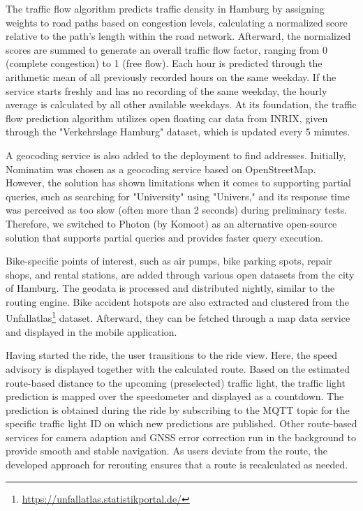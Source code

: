 The traffic flow algorithm predicts traffic density in Hamburg by assigning weights to road paths based on congestion levels, calculating a normalized score relative to the path's length within the road network. Afterward, the normalized scores are summed to generate an overall traffic flow factor, ranging from 0 (complete congestion) to 1 (free flow). Each hour is predicted through the arithmetic mean of all previously recorded hours on the same weekday. If the service starts freshly and has no recording of the same weekday, the hourly average is calculated by all other available weekdays. At its foundation, the traffic flow prediction algorithm utilizes open floating car data from INRIX, given through the "Verkehrslage Hamburg" dataset, which is updated every 5 minutes.

A geocoding service is also added to the deployment to find addresses. Initially, Nominatim was chosen as a geocoding service based on OpenStreetMap. However, the solution has shown limitations when it comes to supporting partial queries, such as searching for "University" using "Univers," and its response time was perceived as too slow (often more than 2 seconds) during preliminary tests. Therefore, we switched to Photon (by Komoot) as an alternative open-source solution that supports partial queries and provides faster query execution.

Bike-specific points of interest, such as air pumps, bike parking spots, repair shops, and rental stations, are added through various open datasets from the city of Hamburg. The geodata is processed and distributed nightly, similar to the routing engine. Bike accident hotspots are also extracted and clustered from the Unfallatlas\footnote{\url{https://unfallatlas.statistikportal.de/}} dataset. Afterward, they can be fetched through a map data service and displayed in the mobile application.

Having started the ride, the user transitions to the ride view. Here, the speed advisory is displayed together with the calculated route. Based on the estimated route-based distance to the upcoming (preselected) traffic light, the traffic light prediction is mapped over the speedometer and displayed as a countdown. The prediction is obtained during the ride by subscribing to the MQTT topic for the specific traffic light ID on which new predictions are published. Other route-based services for camera adaption and GNSS error correction run in the background to provide smooth and stable navigation. As users deviate from the route, the developed approach for rerouting ensures that a route is recalculated as needed.

